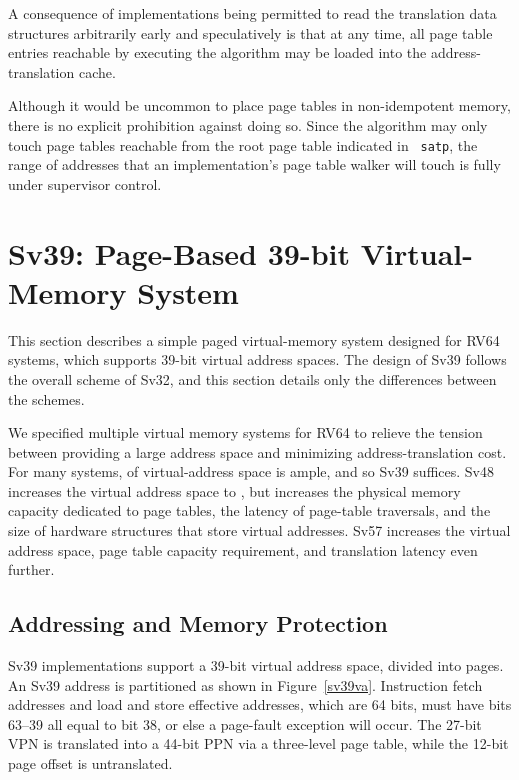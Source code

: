 \begin{commentary}
  A consequence of implementations being permitted to read the translation data
  structures arbitrarily early and speculatively is that at any time, all
  page table entries reachable by executing the algorithm may be loaded into
  the address-translation cache.
\end{commentary}

\begin{commentary}
  Although it would be uncommon to place page tables in non-idempotent memory,
  there is no explicit prohibition against doing so.  Since the algorithm may
  only touch page tables reachable from the root page table indicated in {\tt
  satp}, the range of addresses that an implementation's page table walker will
  touch is fully under supervisor control.
\end{commentary}

\section{Sv39: Page-Based 39-bit Virtual-Memory System}
\label{sec:sv39}

This section describes a simple paged virtual-memory system designed
for RV64 systems, which supports 39-bit virtual address spaces.  The
design of Sv39 follows the overall scheme of Sv32, and this section
details only the differences between the schemes.

\begin{commentary}
We specified multiple virtual memory systems for RV64 to relieve the tension
between providing a large address space and minimizing address-translation
cost.  For many systems,  of virtual-address space is ample,
and so Sv39 suffices.  Sv48 increases the virtual address space to
, but increases the physical memory
capacity dedicated to page tables, the latency of page-table traversals, and
the size of hardware structures that store virtual addresses.  Sv57 increases
the virtual address space, page table capacity requirement, and translation
latency even further.
\end{commentary}

\subsection{Addressing and Memory Protection}

Sv39 implementations support a 39-bit virtual address space, divided
into  pages.  An Sv39 address is partitioned as
shown in Figure~\ref{sv39va}.
Instruction fetch addresses and load and store effective addresses,
which are 64 bits, must have bits 63--39 all equal to bit 38, or else
a page-fault exception will occur.  The 27-bit VPN is translated into a
44-bit PPN via a three-level page table, while the 12-bit page offset
is untranslated.


